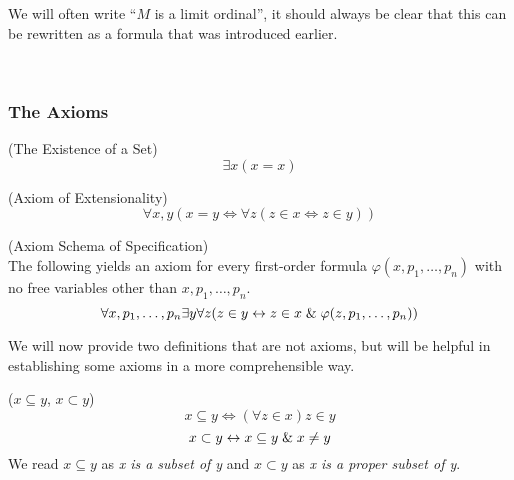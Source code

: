 We will often write ``$M$ is a limit ordinal'', it should always be clear that this can be rewritten as a formula that was introduced earlier.

\


\subsubsection{The Axioms}

\begin{definition}{(The Existence of a Set)}\label{def:existence_of_a_set}
\begin{equation}
\exists x (x = x)
\end{equation}
\end{definition}

\begin{definition}{(Axiom of Extensionality)}\label{def:extensionality}
\begin{equation}
\forall x, y (x = y \iff \forall z (z \in x \iff z \in y)) %
\end{equation}
\end{definition}

\begin{definition}{(Axiom Schema of Specification)}\label{def:specification}\\
The following yields an axiom for every first-order formula $\varphi(x, p_1, \ldots, p_n)$ with no free variables other than $x, p_1, \ldots, p_n$.
\begin{equation}
\forall x, p_1, \ldots, p_n \exists y \forall z ( z \in y \iff z \in x \et \varphi(z, p_1, \ldots, p_n)) %
\end{equation}
\end{definition}

We will now provide two definitions that are not axioms, but will be helpful in establishing some axioms in a more comprehensible way.
\begin{definition}{($x \subseteq y$, $x \subset y$)}\label{def:subset}
\begin{equation}
x \subseteq y \iff (\forall z \in x) z \in y
\end{equation}
\begin{equation}
x \subset y \leftrightarrow x \subseteq y \mathrel{\&} x \neq y
\end{equation}
We read $x \subseteq y$ as \emph{x is a subset of y} and $x \subset y$ as \emph{x is a proper subset of y}.
\end{definition}

